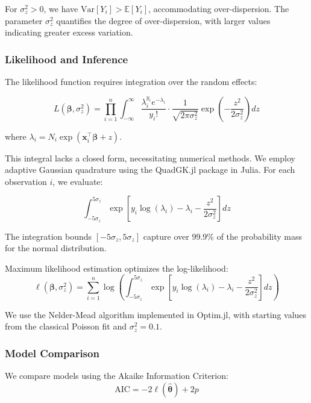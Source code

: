 \documentclass[11pt]{article}
\begin{document}
For $\sigma_z^2 > 0$, we have $\text{Var}[Y_i] > \mathbb{E}[Y_i]$, accommodating over-dispersion. The parameter $\sigma_z^2$ quantifies the degree of over-dispersion, with larger values indicating greater excess variation.

\subsubsection{Likelihood and Inference}

The likelihood function requires integration over the random effects:

\begin{equation}
L(\boldsymbol{\beta}, \sigma_z^2) = \prod_{i=1}^n \int_{-\infty}^{\infty} \frac{\lambda_i^{y_i} e^{-\lambda_i}}{y_i!} \cdot \frac{1}{\sqrt{2\pi\sigma_z^2}} \exp\left(-\frac{z^2}{2\sigma_z^2}\right) dz
\end{equation}

where $\lambda_i = N_i \exp(\mathbf{x}_i^\top \boldsymbol{\beta} + z)$.

This integral lacks a closed form, necessitating numerical methods. We employ adaptive Gaussian quadrature using the QuadGK.jl package in Julia. For each observation $i$, we evaluate:

\begin{equation}
\int_{-5\sigma_z}^{5\sigma_z} \exp\left[ y_i \log(\lambda_i) - \lambda_i - \frac{z^2}{2\sigma_z^2} \right] dz
\end{equation}

The integration bounds $[-5\sigma_z, 5\sigma_z]$ capture over 99.9\% of the probability mass for the normal distribution.

Maximum likelihood estimation optimizes the log-likelihood:
\begin{equation}
\ell(\boldsymbol{\beta}, \sigma_z^2) = \sum_{i=1}^n \log \left( \int_{-5\sigma_z}^{5\sigma_z} \exp\left[ y_i \log(\lambda_i) - \lambda_i - \frac{z^2}{2\sigma_z^2} \right] dz \right)
\end{equation}

We use the Nelder-Mead algorithm implemented in Optim.jl, with starting values from the classical Poisson fit and $\sigma_z^2 = 0.1$.

\subsubsection{Model Comparison}

We compare models using the Akaike Information Criterion:
\begin{equation}
\text{AIC} = -2\ell(\hat{\boldsymbol{\theta}}) + 2p
\end{equation}
\end{document}
